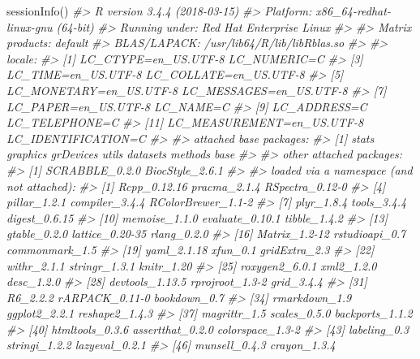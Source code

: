 \documentclass[]{article}
\newcommand{\hlcom}[1]{\textcolor[rgb]{0.502,0.502,0.502}{\textit{#1}}}%
\newcommand{\hlstd}[1]{\textcolor[rgb]{0.251,0.251,0.251}{#1}}%
\newcommand{\hlkwd}[1]{\textcolor[rgb]{0.878,0.439,0.125}{#1}}%
\newenvironment{Shaded}{\begin{myshaded}}{\end{myshaded}}
\newcommand{\KeywordTok}[1]{\hlkwd{#1}}
\newcommand{\CommentTok}[1]{\hlcom{#1}}
\newcommand{\NormalTok}[1]{\hlstd{#1}}
\begin{document}
\begin{Shaded}
\begin{Highlighting}[]
\KeywordTok{sessionInfo}\NormalTok{()}
\CommentTok{#> R version 3.4.4 (2018-03-15)}
\CommentTok{#> Platform: x86_64-redhat-linux-gnu (64-bit)}
\CommentTok{#> Running under: Red Hat Enterprise Linux}
\CommentTok{#> }
\CommentTok{#> Matrix products: default}
\CommentTok{#> BLAS/LAPACK: /usr/lib64/R/lib/libRblas.so}
\CommentTok{#> }
\CommentTok{#> locale:}
\CommentTok{#>  [1] LC_CTYPE=en_US.UTF-8       LC_NUMERIC=C              }
\CommentTok{#>  [3] LC_TIME=en_US.UTF-8        LC_COLLATE=en_US.UTF-8    }
\CommentTok{#>  [5] LC_MONETARY=en_US.UTF-8    LC_MESSAGES=en_US.UTF-8   }
\CommentTok{#>  [7] LC_PAPER=en_US.UTF-8       LC_NAME=C                 }
\CommentTok{#>  [9] LC_ADDRESS=C               LC_TELEPHONE=C            }
\CommentTok{#> [11] LC_MEASUREMENT=en_US.UTF-8 LC_IDENTIFICATION=C       }
\CommentTok{#> }
\CommentTok{#> attached base packages:}
\CommentTok{#> [1] stats     graphics  grDevices utils     datasets  methods   base     }
\CommentTok{#> }
\CommentTok{#> other attached packages:}
\CommentTok{#> [1] SCRABBLE_0.2.0  BiocStyle_2.6.1}
\CommentTok{#> }
\CommentTok{#> loaded via a namespace (and not attached):}
\CommentTok{#>  [1] Rcpp_0.12.16       pracma_2.1.4       RSpectra_0.12-0   }
\CommentTok{#>  [4] pillar_1.2.1       compiler_3.4.4     RColorBrewer_1.1-2}
\CommentTok{#>  [7] plyr_1.8.4         tools_3.4.4        digest_0.6.15     }
\CommentTok{#> [10] memoise_1.1.0      evaluate_0.10.1    tibble_1.4.2      }
\CommentTok{#> [13] gtable_0.2.0       lattice_0.20-35    rlang_0.2.0       }
\CommentTok{#> [16] Matrix_1.2-12      rstudioapi_0.7     commonmark_1.5    }
\CommentTok{#> [19] yaml_2.1.18        xfun_0.1           gridExtra_2.3     }
\CommentTok{#> [22] withr_2.1.1        stringr_1.3.1      knitr_1.20        }
\CommentTok{#> [25] roxygen2_6.0.1     xml2_1.2.0         desc_1.2.0        }
\CommentTok{#> [28] devtools_1.13.5    rprojroot_1.3-2    grid_3.4.4        }
\CommentTok{#> [31] R6_2.2.2           rARPACK_0.11-0     bookdown_0.7      }
\CommentTok{#> [34] rmarkdown_1.9      ggplot2_2.2.1      reshape2_1.4.3    }
\CommentTok{#> [37] magrittr_1.5       scales_0.5.0       backports_1.1.2   }
\CommentTok{#> [40] htmltools_0.3.6    assertthat_0.2.0   colorspace_1.3-2  }
\CommentTok{#> [43] labeling_0.3       stringi_1.2.2      lazyeval_0.2.1    }
\CommentTok{#> [46] munsell_0.4.3      crayon_1.3.4}
\end{Highlighting}
\end{Shaded}
\end{document}
